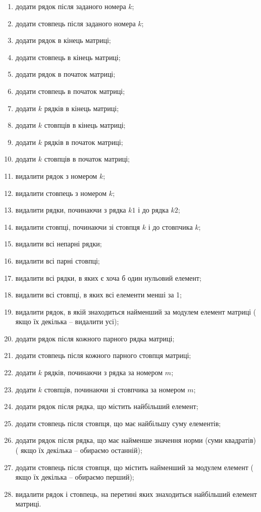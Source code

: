 \documentclass[a5paper,titlepage,openany,twoside,
]
{book_unv}%
\makeatletter
\newcommand{\xslalph}[1]{\expandafter\@xslalph\csname c@#1\endcsname}
\newcommand{\@xslalph}[1]{%
    \ifcase#1\or а\or б\or в\or г\or д\or e\or є\or ж\or з\or i%
    \or й\or к\or л\or м\or н\or о\or п\or р\or с\or т%
    \or у\or ф\or х\or ц\or ч\or ш\or ю\or я\or аа\or бб\or вв%
    \else\@ctrerr\fi%
}
\makeatother
\begin{document}
\begin{enumerate}
\begin{enumerate}[label=\xslalph*)]
\item
  додати рядок після заданого номера $k$;
\item
  додати стовпець після заданого номера $k$;
\item
  додати рядок в кінець матриці;
\item
  додати стовпець в кінець матриці;
\item
  додати рядок в початок матриці;
\item
  додати стовпець в початок матриці;
\item
  додати $k$ рядків в кінець матриці;
\item
  додати $k$ стовпців в кінець матриці;
\item
  додати $k$ рядків в початок матриці;
\item
  додати $k$ стовпців в початок матриці;
\item
  видалити рядок з номером $k$;
\item
  видалити стовпець з номером $k$;
\item
  видалити рядки, починаючи з рядка $k1$ і до рядка $k2$;
\item
  видалити стовпці, починаючи зі стовпця $k$ і до стовпчика $k$;
\item
  видалити всі непарні рядки;
\item
  видалити всі парні стовпці;
\item
  видалити всі рядки, в яких є хоча б один нульовий елемент;
\item
  видалити всі стовпці, в яких всі елементи менші за 1;
\item
  видалити рядок, в якій знаходиться найменший за модулем елемент матриці (
якщо їх декілька -- видалити усі);
\item
  додати рядок після кожного парного рядка матриці;
\item
  додати стовпець після кожного парного стовпця матриці;
\item
  додати $k$ рядків, починаючи з рядка за номером $m$;
\item
  додати $k$ стовпців, починаючи зі стовпчика за номером $m$;
\item
  додати рядок після рядка, що містить найбільший елемент;
\item
  додати стовпець після стовпця, що має найбільшу суму елементів;
\item
  додати рядок після рядка, що має найменше значення норми (суми квадратів)(
якщо їх декілька -- обираємо останній);
\item
  додати стовпець після стовпця, що містить найменший за модулем елемент (
якщо їх декілька -- обираємо перший);
\item
  видалити рядок і стовпець, на перетині яких знаходиться найбільший
  елемент матриці.
\end{enumerate}

\end{enumerate}
\end{document}

